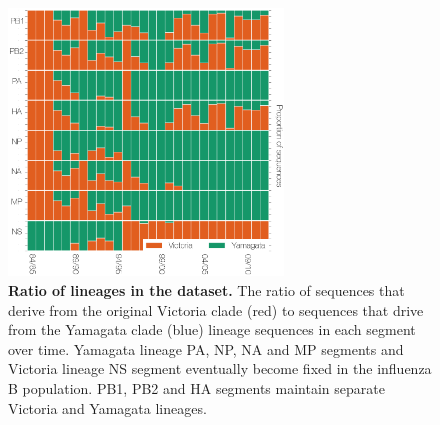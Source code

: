 \documentclass[11pt,oneside,letterpaper]{article}
\begin{document}
\begin{figure}[h]
	\centering	
	\includegraphics[width=0.65\textwidth]	{figures/InfB_LineageRatiosOverTime.png}
	\caption{\textbf{Ratio of lineages in the dataset.}
The ratio of sequences that derive from the original Victoria clade (red) to sequences that drive from the Yamagata clade (blue) lineage sequences in each segment over time.
Yamagata lineage PA, NP, NA and MP segments and Victoria lineage NS segment eventually become fixed in the influenza B population.
PB1, PB2 and HA segments maintain separate Victoria and Yamagata lineages.}
	\label{lineageRatiosOverTime}
\end{figure}

\end{document}
